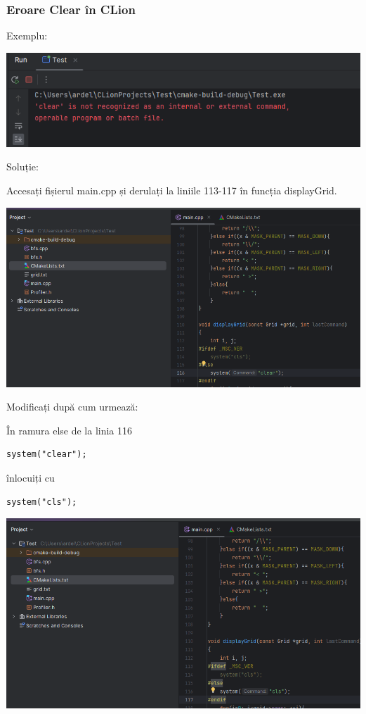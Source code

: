 \documentclass[../ro-fa-lab.tex]{subfiles}
\begin{document}
\subsubsection{Eroare Clear în CLion}\label{clion-clear-error}

Exemplu:

\includegraphics[width=\textwidth,alt={A screenshot of a computer program Description automatically generated}]{./Resources/tutorial_lab9/image22.png}

Soluție:

Accesați fișierul main.cpp și derulați la liniile 113-117 în funcția displayGrid.

\includegraphics[width=\textwidth,alt={A screen shot of a computer Description automatically generated}]{./Resources/tutorial_lab9/image23.png}

Modificați după cum urmează:

În ramura else de la linia 116

\begin{verbatim}
system("clear");
\end{verbatim}

înlocuiți cu

\begin{verbatim}
system("cls");
\end{verbatim}

\includegraphics[width=\textwidth,alt={A screenshot of a computer program Description automatically generated}]{./Resources/tutorial_lab9/image24.png}
\end{document}
